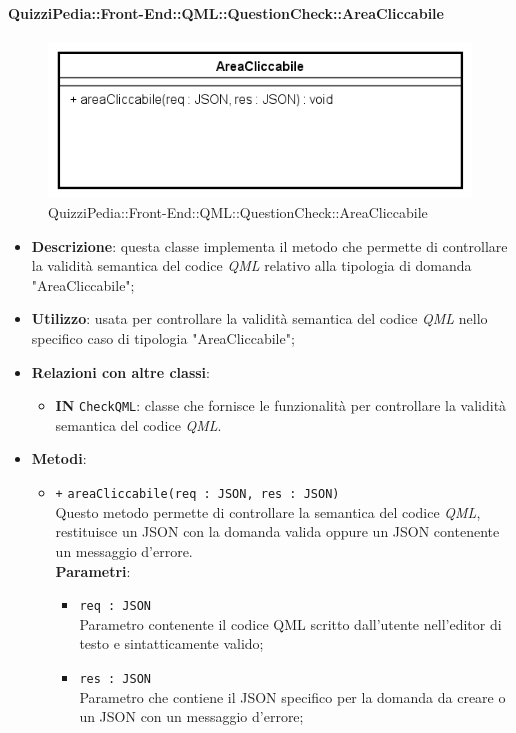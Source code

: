 \paragraph[QuizziPedia::Front-End::QML:: \\ QuestionCheck::AreaCliccabile]{QuizziPedia::Front-End::QML::QuestionCheck::AreaCliccabile}
\begin{figure} [ht]
	\centering
	\includegraphics[scale=0.32]{UML/Classi/Front-End/QuizziPedia_Front-end_QML_QuestionCheck_AreaCliccabile.png}
	\caption{QuizziPedia::Front-End::QML::QuestionCheck::AreaCliccabile}
\end{figure} \FloatBarrier
\begin{itemize}
	\item \textbf{Descrizione}: questa classe implementa il metodo che permette di controllare la validità semantica del codice \textit{QML} relativo alla tipologia di domanda "AreaCliccabile";
	\item \textbf{Utilizzo}: usata per controllare la validità semantica del codice \textit{QML} nello specifico caso di tipologia "AreaCliccabile";
	\item \textbf{Relazioni con altre classi}:
	\begin{itemize}
		\item \textbf{IN} \texttt{CheckQML}: classe che fornisce le funzionalità per controllare la validità semantica del codice \textit{QML}.
	\end{itemize}
	\item \textbf{Metodi}:
	\begin{itemize}
		\item \texttt{+} \texttt{areaCliccabile(req : JSON, res : JSON)} \\
		 Questo metodo permette di controllare la semantica del codice \textit{QML}, restituisce un JSON con la domanda valida oppure un JSON contenente un messaggio d'errore. \\
		\textbf{Parametri}:
		\begin{itemize}
			\item \texttt{req : JSON} \\
			Parametro contenente il codice QML scritto dall'utente nell'editor di testo e sintatticamente valido;
			\item \texttt{res : JSON} \\
			Parametro che contiene il JSON specifico per la domanda da creare o un JSON con un messaggio d'errore;
		\end{itemize}
	\end{itemize}
\end{itemize}

